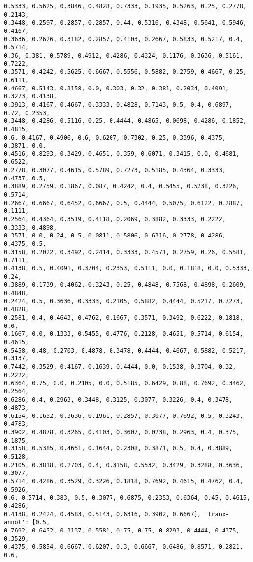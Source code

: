 \documentclass[11pt]{article}
\begin{document}
\begin{Verbatim}[commandchars=\\\{\}]
0.5333, 0.5625, 0.3846, 0.4828, 0.7333, 0.1935, 0.5263, 0.25, 0.2778, 0.2143,
0.3448, 0.2597, 0.2857, 0.2857, 0.44, 0.5316, 0.4348, 0.5641, 0.5946, 0.4167,
0.3636, 0.2626, 0.3182, 0.2857, 0.4103, 0.2667, 0.5833, 0.5217, 0.4, 0.5714,
0.36, 0.381, 0.5789, 0.4912, 0.4286, 0.4324, 0.1176, 0.3636, 0.5161, 0.7222,
0.3571, 0.4242, 0.5625, 0.6667, 0.5556, 0.5882, 0.2759, 0.4667, 0.25, 0.6111,
0.4667, 0.5143, 0.3158, 0.0, 0.303, 0.32, 0.381, 0.2034, 0.4091, 0.3273, 0.4138,
0.3913, 0.4167, 0.4667, 0.3333, 0.4828, 0.7143, 0.5, 0.4, 0.6897, 0.72, 0.2353,
0.3448, 0.4286, 0.5116, 0.25, 0.4444, 0.4865, 0.0698, 0.4286, 0.1852, 0.4815,
0.6, 0.4167, 0.4906, 0.6, 0.6207, 0.7302, 0.25, 0.3396, 0.4375, 0.3871, 0.0,
0.4516, 0.8293, 0.3429, 0.4651, 0.359, 0.6071, 0.3415, 0.0, 0.4681, 0.6522,
0.2778, 0.3077, 0.4615, 0.5789, 0.7273, 0.5185, 0.4364, 0.3333, 0.4737, 0.5,
0.3889, 0.2759, 0.1867, 0.087, 0.4242, 0.4, 0.5455, 0.5238, 0.3226, 0.5714,
0.2667, 0.6667, 0.6452, 0.6667, 0.5, 0.4444, 0.5075, 0.6122, 0.2887, 0.1111,
0.2564, 0.4364, 0.3519, 0.4118, 0.2069, 0.3882, 0.3333, 0.2222, 0.3333, 0.4898,
0.3571, 0.0, 0.24, 0.5, 0.0811, 0.5806, 0.6316, 0.2778, 0.4286, 0.4375, 0.5,
0.3158, 0.2022, 0.3492, 0.2414, 0.3333, 0.4571, 0.2759, 0.26, 0.5581, 0.7111,
0.4138, 0.5, 0.4091, 0.3704, 0.2353, 0.5111, 0.0, 0.1818, 0.0, 0.5333, 0.24,
0.3889, 0.1739, 0.4062, 0.3243, 0.25, 0.4848, 0.7568, 0.4898, 0.2609, 0.4848,
0.2424, 0.5, 0.3636, 0.3333, 0.2105, 0.5882, 0.4444, 0.5217, 0.7273, 0.4828,
0.2581, 0.4, 0.4643, 0.4762, 0.1667, 0.3571, 0.3492, 0.6222, 0.1818, 0.0,
0.1667, 0.0, 0.1333, 0.5455, 0.4776, 0.2128, 0.4651, 0.5714, 0.6154, 0.4615,
0.5458, 0.48, 0.2703, 0.4878, 0.3478, 0.4444, 0.4667, 0.5882, 0.5217, 0.3137,
0.7442, 0.3529, 0.4167, 0.1639, 0.4444, 0.0, 0.1538, 0.3704, 0.32, 0.2222,
0.6364, 0.75, 0.0, 0.2105, 0.0, 0.5185, 0.6429, 0.88, 0.7692, 0.3462, 0.2564,
0.6286, 0.4, 0.2963, 0.3448, 0.3125, 0.3077, 0.3226, 0.4, 0.3478, 0.4873,
0.6154, 0.1652, 0.3636, 0.1961, 0.2857, 0.3077, 0.7692, 0.5, 0.3243, 0.4783,
0.3902, 0.4878, 0.3265, 0.4103, 0.3607, 0.0238, 0.2963, 0.4, 0.375, 0.1875,
0.3158, 0.5385, 0.4651, 0.1644, 0.2308, 0.3871, 0.5, 0.4, 0.3889, 0.5128,
0.2105, 0.3818, 0.2703, 0.4, 0.3158, 0.5532, 0.3429, 0.3288, 0.3636, 0.3077,
0.5714, 0.4286, 0.3529, 0.3226, 0.1818, 0.7692, 0.4615, 0.4762, 0.4, 0.5926,
0.6, 0.5714, 0.383, 0.5, 0.3077, 0.6875, 0.2353, 0.6364, 0.45, 0.4615, 0.4286,
0.4138, 0.2424, 0.4583, 0.5143, 0.6316, 0.3902, 0.6667], 'tranx-annot': [0.5,
0.7692, 0.6452, 0.3137, 0.5581, 0.75, 0.75, 0.8293, 0.4444, 0.4375, 0.3529,
0.4375, 0.5854, 0.6667, 0.6207, 0.3, 0.6667, 0.6486, 0.8571, 0.2821, 0.6,

\end{Verbatim}
\end{document}

